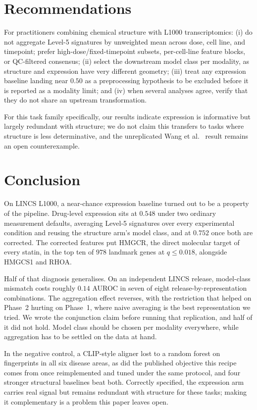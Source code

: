 \documentclass[conference]{IEEEtran}
\begin{document}
\section{Recommendations}
\label{sec:recs}

For practitioners combining chemical structure with L1000 transcriptomics:
(i) do not aggregate Level-5 signatures by unweighted mean across dose, cell line,
and timepoint; prefer high-dose/fixed-timepoint subsets, per-cell-line feature
blocks, or QC-filtered consensus; (ii) select the downstream model class per
modality, as structure and expression have very different geometry;
(iii) treat any expression baseline landing near $0.50$ as a preprocessing
hypothesis to be excluded before it is reported as a modality limit; and
(iv) when several analyses agree, verify that they do not share an upstream
transformation.

For this task family specifically, our results indicate expression is informative
but largely redundant with structure; we do not claim this transfers to tasks
where structure is less determinative, and the unreplicated Wang et al.~\cite{wang2016}
result remains an open counterexample.

\section{Conclusion}

On LINCS L1000, a near-chance expression baseline turned out to be a property of
the pipeline. Drug-level
expression sits at $0.548$ under two ordinary measurement defaults, averaging
Level-5 signatures over every experimental condition and reusing the structure
arm's model class, and at $0.752$ once both are corrected. The corrected
features put HMGCR, the direct molecular target of every statin, in the top ten of
$978$ landmark genes at $q \le 0.018$, alongside HMGCS1 and RHOA.

Half of that diagnosis generalises. On an independent LINCS release, model-class
mismatch costs roughly $0.14$ AUROC in seven of eight release-by-representation
combinations. The aggregation effect reverses, with the restriction that helped
on Phase~2 hurting on Phase~1, where naive averaging is the best representation
we tried. We wrote the conjunction claim before running that replication, and
half of it did not hold. Model class should be chosen per modality everywhere,
while aggregation has to be settled on the data at hand.

In the negative control, a CLIP-style aligner lost to a random forest on
fingerprints in all six disease areas, as did the published objective this recipe
comes from once reimplemented and tuned under the same protocol, and four
stronger structural baselines beat both. Correctly specified, the expression arm
carries real signal but remains redundant with structure for these tasks; making
it complementary is a problem this paper leaves open.
\end{document}
